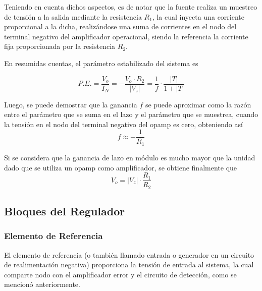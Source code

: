 Teniendo en cuenta dichos aspectos, es de notar que la fuente realiza un muestreo de tensión a la salida mediante la resistencia $R_1$, la cual inyecta una corriente proporcional a la dicha, realizándose una suma de corrientes en el nodo del terminal negativo del amplificador operacional, siendo la referencia la corriente fija proporcionada por la resistencia $R_2$.

En resumidas cuentas, el parámetro estabilizado del sistema es

\begin{equation}
P.E. = \frac{V_o}{I_N} = -\frac{V_o \cdot R_2}{|V_z|} = \frac{1}{f} \cdot \frac{|T|}{1 + |T|}
\end{equation}

Luego, se puede demostrar que la ganancia $f$ se puede aproximar como la razón entre el parámetro que se suma en el lazo y el parámetro que se muestrea, cuando la tensión en el nodo del terminal negativo del opamp es cero, obteniendo así
\begin{equation}
f \approx -\frac{1}{R_1}
\end{equation}

Si se considera que la ganancia de lazo en módulo es mucho mayor que la unidad dado que se utiliza un opamp como amplificador, se obtiene finalmente que
\begin{equation}
V_o = |V_z| \cdot \frac{R_1}{R_2}
\label{eq:vovz}
\end{equation}

\subsection{Bloques del Regulador}
\subsubsection{Elemento de Referencia}

El elemento de referencia (o también llamado entrada o generador en un circuito de realimentación negativa) proporciona la tensión de entrada al sistema, la cual comparte nodo con el amplificador error y el circuito de detección, como se mencionó anteriormente.


